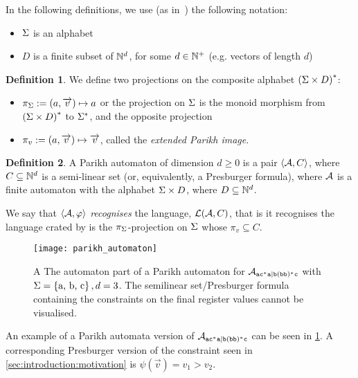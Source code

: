\documentclass[acmsmall,review,anonymous,screen]{acmart}\settopmatter{printfolios=true,printccs=false,printacmref=true}
\theoremstyle{definition}
\newtheorem{definition}{Definition}[section]
\begin{document}
In the following definitions, we use (as in~\cite{expressiveness}) the following notation:
\begin{itemize}
  \item $\Sigma$ is an alphabet
  \item $D$ is a finite subset of $\mathbb{N}^d$, for some $d \in \mathbb{N}^+$ (e.g. vectors of length $d$)
\end{itemize}

\begin{definition}\label{def:projections}
  We define two projections on the composite alphabet $\left(\Sigma \times D\right)^*$:
  \begin{itemize}
    \item $\pi_{\Sigma} := (a, \overrightarrow{v}) \mapsto a$ or the projection on $\Sigma$ is the monoid morphism from $\left(\Sigma \times D\right)^*$ to $\Sigma^*$, and the opposite projection
    \item $\pi_{v} := (a, \overrightarrow{v}) \mapsto \overrightarrow{v}$, called the
    \emph{extended Parikh image}.
  \end{itemize}
\end{definition}

\begin{definition}\label{def:parikh-automata} A Parikh automaton of dimension $d
  \geq 0$ is a pair $\left\langle\mathcal{A}, C\right\rangle$, where $C \subseteq \mathbb{N}^d$ is a semi-linear set (or, equivalently, a Presburger formula), where $\mathcal{A}$ is a finite automaton with the alphabet $\Sigma \times D$, where $D \subseteq \mathbb{N}^d$.

  We say that $\left\langle\mathcal{A}, \varphi\right\rangle$ \emph{recognises} the language, $\operatorname{\mathcal{L}}(\mathcal{A}, C)$, that is it recognises the language crated by is the $\pi_\Sigma$-projection on $\Sigma$ whose $\pi_{v} \subseteq C$.
\end{definition}

\begin{figure}[ht]
  \centering
      \texttt{[image: parikh\_automaton]}
      \caption{A The automaton part of a Parikh automaton for $\mathcal{A}_{\mathtt{ac^*a|b(bb)^*c}}{}$ with
      $\Sigma = \left\{\text{a, b, c}\right\}, d = 3$. The semilinear set/Presburger
      formula containing the constraints on the final register values cannot be
      visualised.}\label{fig:parikh-automaton}
    \end{figure}
  

An example of a Parikh automata version of $\mathcal{A}_{\mathtt{ac^*a|b(bb)^*c}}{}$ can be seen in \cref{fig:parikh-automaton}. A corresponding Presburger version of the constraint seen in \cref{sec:introduction:motivation} is $\psi(\Vec{v}) = v_1 > v_2$.
\end{document}
